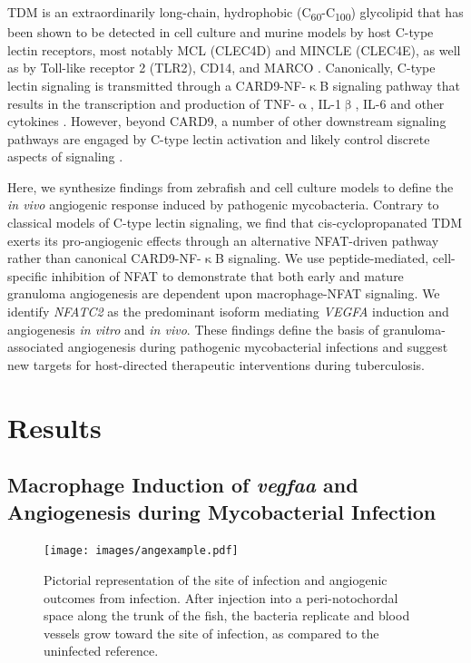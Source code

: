 TDM is an extraordinarily long-chain, hydrophobic (C\textsubscript{60}-C\textsubscript{100}) glycolipid \citep{Noll1956a, Noll1956b, Hunter2006a, Behling1993} that has been shown to be detected in cell culture and murine models by host C-type lectin receptors, most notably MCL (CLEC4D) and MINCLE (CLEC4E), as well as by Toll-like receptor 2 (TLR2), CD14, and MARCO \citep{Bowdish2009, Matsunaga2009, Miyake2013, Ishikawa2009}. Canonically, C-type lectin signaling is transmitted through a CARD9-NF-$\upkappa$B signaling pathway that results in the transcription and production of TNF-$\upalpha$, IL-1$\upbeta$, IL-6 and other cytokines \citep{Yamasaki2008, Goodridge2009, LobatoPascual2013, Zhao2014, Deerhake2021}. However, beyond CARD9, a number of other downstream signaling pathways are engaged by C-type lectin activation and likely control discrete aspects of signaling \citep{Goodridge2007, Deerhake2021}.

Here, we synthesize findings from zebrafish and cell culture models to define the \textit{in vivo} angiogenic response induced by pathogenic mycobacteria. Contrary to classical models of C-type lectin signaling, we find that cis-cyclopropanated TDM exerts its pro-angiogenic effects through an alternative NFAT-driven pathway rather than canonical CARD9-NF-$\upkappa$B signaling. We use peptide-mediated, cell-specific inhibition of NFAT to demonstrate that both early and mature granuloma angiogenesis are dependent upon macrophage-NFAT signaling. We identify \textit{NFATC2} as the predominant isoform mediating \textit{VEGFA} induction and angiogenesis \textit{in vitro} and \textit{in vivo}. These findings define the basis of granuloma-associated angiogenesis during pathogenic mycobacterial infections and suggest new targets for host-directed therapeutic interventions during tuberculosis.

\section{Results}

\subsection{Macrophage Induction of \textit{vegfaa} and Angiogenesis during Mycobacterial Infection}

\begin{figure}
\centering
\texttt{[image: images/angexample.pdf]}
\caption{Pictorial representation of the site of infection and angiogenic outcomes from infection. After injection into a peri-notochordal space along the trunk of the fish, the bacteria replicate and blood vessels grow toward the site of infection, as compared to the uninfected reference.}
\label{figure:angexample}

\end{figure}

